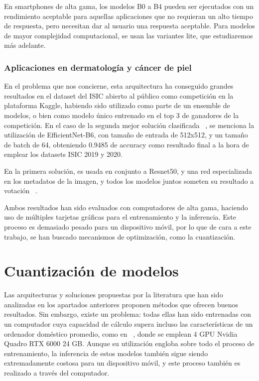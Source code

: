 En smartphones de alta gama, los modelos B0 a B4 pueden ser ejecutados con un rendimiento aceptable para aquellas aplicaciones que no requieran un alto tiempo de respuesta, pero necesitan dar al usuario una respuesta aceptable. Para modelos de mayor complejidad computacional, se usan las variantes lite, que estudiaremos más adelante.


\subsubsection{Aplicaciones en dermatología y cáncer de piel}

En el problema que nos concierne, esta arquitectura ha conseguido grandes resultados en el dataset del ISIC abierto al público como competición en la plataforma Kaggle, habiendo sido utilizado como parte de un ensemble de modelos, o bien como modelo único entrenado en el top 3 de ganadores de la competición. En el caso de la segunda mejor solución clasificada ~\cite{2ndISIC}, se menciona la utilización de EfficientNet-B6, con tamaño de entrada de 512x512, y un tamaño de batch de 64, obteniendo 0.9485 de accuracy como resultado final a la hora de emplear los datasets ISIC 2019 y 2020.

 En la primera solución, es usada en conjunto a Resnet50, y una red especializada en los metadatos de la imagen, y todos los modelos juntos someten su resultado a votación ~\cite{1stISIC}.

Ambos resultados han sido evaluados con computadores de alta gama, haciendo uso de múltiples tarjetas gráficas para el entrenamiento y la inferencia. Este proceso es demasiado pesado para un dispositivo móvil, por lo que de cara a este trabajo, se han buscado mecanismos de optimización, como la cuantización.

 \section{Cuantización de modelos}
\label{cap:cuantización}
Las arquitecturas y soluciones propuestas por la literatura que han sido analizadas en los apartados anteriores proponen métodos que ofrecen buenos resultados. Sin embargo, existe un problema: todas ellas han sido entrenadas con un computador cuya capacidad de cálculo supera incluso las características de un ordenador doméstico promedio, como en ~\cite{2ndISIC}, donde se emplean 4  GPU Nvidia Quadro RTX 6000 24 GB. Aunque su utilización engloba sobre todo el proceso de entrenamiento, la inferencia de estos modelos también sigue siendo extremadamente costosa para un dispositivo móvil, y este proceso también es realizado a través del computador.

